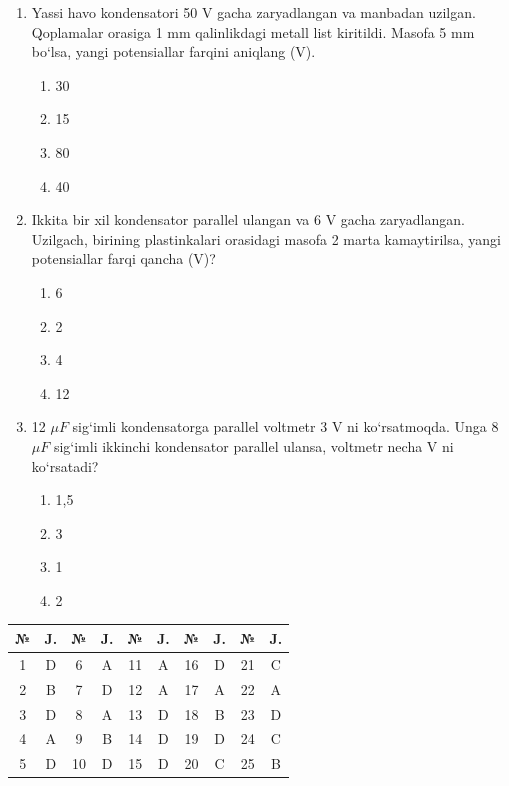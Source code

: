 \begin{enumerate}
\item Yassi havo kondensatori 50 V gacha zaryadlangan va manbadan uzilgan. Qoplamalar orasiga 1 mm qalinlikdagi metall list kiritildi. Masofa 5 mm bo‘lsa, yangi potensiallar farqini aniqlang (V).
\begin{enumerate}[label=\Alph*)]
\item 30
\item 15
\item 80
\item 40
\end{enumerate}

\item Ikkita bir xil kondensator parallel ulangan va 6 V gacha zaryadlangan. Uzilgach, birining plastinkalari orasidagi masofa 2 marta kamaytirilsa, yangi potensiallar farqi qancha (V)?
\begin{enumerate}[label=\Alph*)]
\item 6
\item 2
\item 4
\item 12
\end{enumerate}

\item 12 $\mu F$ sig‘imli kondensatorga parallel voltmetr 3 V ni ko‘rsatmoqda. Unga 8 $\mu F$ sig‘imli ikkinchi kondensator parallel ulansa, voltmetr necha V ni ko‘rsatadi?
\begin{enumerate}[label=\Alph*)]
\item 1,5
\item 3
\item 1
\item 2
\end{enumerate}

\end{enumerate}



\begin{table}[h!]
\centering
\begin{tabular}{|c|c|c|c|c|c|c|c|c|c|}
\hline
№ & J. & № & J. & № & J. & № & J. & № & J. \\ \hline
1 & D & 6 & A & 11 & A & 16 & D & 21 & C \\ \hline
2 & B & 7 & D & 12 & A & 17 & A & 22 & A \\ \hline
3 & D & 8 & A & 13 & D & 18 & B & 23 & D \\ \hline
4 & A & 9 & B & 14 & D & 19 & D & 24 & C \\ \hline
5 & D & 10 & D & 15 & D & 20 & C & 25 & B \\ \hline
\end{tabular}
\end{table}
